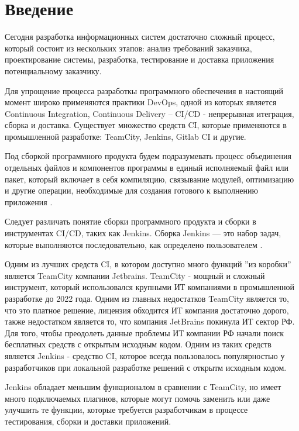 \chapter*{Введение} %

Сегодня разработка информационных систем достаточно сложный процесс, который состоит из нескольких этапов: анализ требований заказчика, проектирование системы, разработка, тестирование и доставка приложения потенциальному заказчику. 

Для упрощение процесса разработкы программного обеспечения в настоящий момент широко применяются практики DevOps, одной из которых является Continuous Integration, Continuous Delivery -- CI/CD - непрерывная итеграция, сборка и доставка. Существует множество средств CI, которые применяются в промышленной разработке: TeamCity, Jenkins, Gitlab CI и другие.

Под сборкой программного продукта будем подразумевать процесс объединения отдельных файлов и компонентов программы в единый исполняемый файл или пакет, который включает в себя компиляцию, связывание модулей, оптимизацию и другие операции, необходимые для создания готового к выполнению приложения \cite{build}.

Следует различать понятие сборки программного продукта и сборки в инструментах CI/CD, таких как Jenkins. Сборка Jenkins — это набор задач, которые выполняются последовательно, как определено пользователем \cite{jenkinsjob}.


Одним из лучших средств CI, в котором доступно много функций ''из коробки'' является TeamCity компании Jetbrains. TeamCity - мощный и сложный инструмент, который использовался крупными ИТ компаниями в промышленной разработке до 2022 года. Одним из главных недостатков TeamCity является то, что это платное решение, лицензия обходится ИТ компания достаточно дорого, также недостатком является то, что компания JetBrains покинула ИТ сектор РФ. Для того, чтобы преодолеть данные проблемы ИТ компании РФ начали поиск бесплатных средств с открытым исходным кодом. Одним из таких средств является Jenkins - средство CI, которое всегда пользовалось популярностью у разработчиков при локальной разработке решений с открытм исходным кодом. 

Jenkins обладает меньшим функционалом в сравнении с TeamCity, но имеет много подключаемых плагинов, которые могут помочь заменить или даже улучшить те функции, которые требуется разработчикам в процессе тестирования, сборки и доставки приложений.

